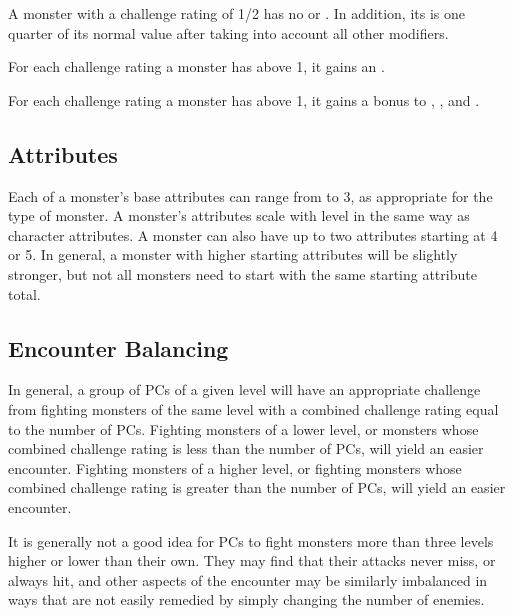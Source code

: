          A monster with a challenge rating of 1/2 has no  or .
        In addition, its  is one quarter of its normal value after taking into account all other modifiers.

         For each challenge rating a monster has above 1, it gains an .

         For each challenge rating a monster has above 1, it gains a  bonus to , , and .

    \subsection{Attributes}
        Each of a monster's base attributes can range from  to 3, as appropriate for the type of monster.
        A monster's attributes scale with level in the same way as character attributes.
        A monster can also have up to two attributes starting at 4 or 5.
        In general, a monster with higher starting attributes will be slightly stronger, but not all monsters need to start with the same starting attribute total.

    \subsection{Encounter Balancing}\label{Encounter Balancing}
        In general, a group of PCs of a given level will have an appropriate challenge from fighting monsters of the same level with a combined challenge rating equal to the number of PCs.
        Fighting monsters of a lower level, or monsters whose combined challenge rating is less than the number of PCs, will yield an easier encounter.
        Fighting monsters of a higher level, or fighting monsters whose combined challenge rating is greater than the number of PCs, will yield an easier encounter.

        It is generally not a good idea for PCs to fight monsters more than three levels higher or lower than their own.
        They may find that their attacks never miss, or always hit, and other aspects of the encounter may be similarly imbalanced in ways that are not easily remedied by simply changing the number of enemies.


